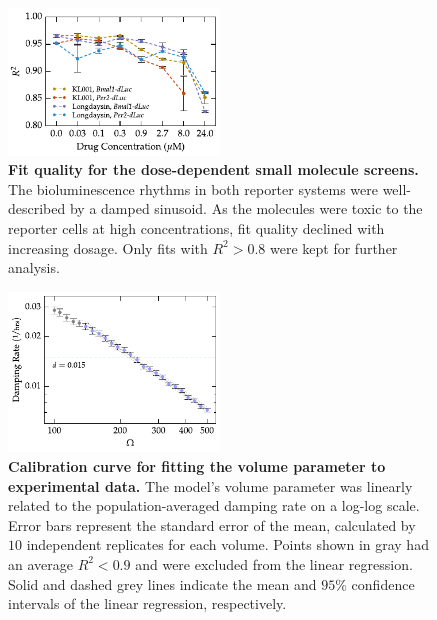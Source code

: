 \documentclass[11pt, letterpaper]{article}
\begin{document}
\begin{figure}[tbp]
  \begin{center}
    \includegraphics[width=0.5\textwidth]{figures/pdfs/small_molecule_r2.pdf}
  \end{center}
  \caption{{\bfseries Fit quality for the dose-dependent small molecule screens.} The bioluminescence rhythms in both reporter systems were well-described by a damped sinusoid. As the molecules were toxic to the reporter cells at high concentrations, fit quality declined with increasing dosage. Only fits with $R^2 > 0.8$ were kept for further analysis.}
\label{fig:small_molecule_r2}
\end{figure}

\begin{figure}[tbp]
  \begin{center}
    \includegraphics[width=0.5\textwidth]{figures/pdfs/volume_calibration.pdf}
  \end{center}
  \caption{{\bfseries Calibration curve for fitting the volume parameter to experimental data.} The model's volume parameter was linearly related to the population-averaged damping rate on a log-log scale. Error bars represent the standard error of the mean, calculated by $10$ independent replicates for each volume. Points shown in gray had an average $R^2 < 0.9$ and were excluded from the linear regression. Solid and dashed grey lines indicate the mean and $95\%$ confidence intervals of the linear regression, respectively.}
\label{fig:vol_calibration}
\end{figure}
\end{document}
